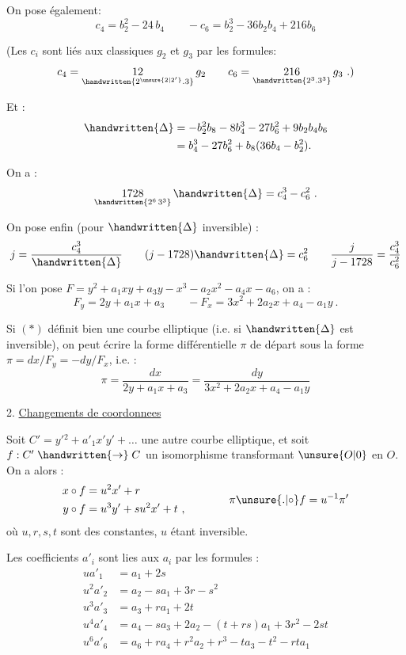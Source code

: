 On pose également:
\[
 c_{4}=b_{2}^{2}-24\,b_{4}\qquad -c_{6}=b_{2}^{3}-36b_{2}b_{4}+216b_{6}
\]

(Les $c_{i}$ sont liés aux classiques $g_{2}$ et $g_{3}$ par les formules:
\[
 c_{4}=\underset{\handwritten{2^{\unsure{2|2'}}\mathord{.}3}}{12}\,g_{2}
 \qquad c_{6}=\underset{\handwritten{2^{3}\mathord{.}3^{3}}}{216}\,g_{3}\ .)
\]

Et :
\[
\begin{aligned}
\handwritten{\Delta}&=-b_{2}^{2}b_{8}-8b_{4}^{3}-27b_{6}^{2}+9b_{2}b_{4}b_{6}\\
&=b_{4}^{3}-27b_{6}^{2}+b_{8}(36b_{4}-b_{2}^{2}).
\end{aligned}
\]

On a :
\[
 \underset{\handwritten{2^{6}\,3^{3}}}{1728}\,\handwritten{\Delta}=c_{4}^{3}-c_{6}^{2}\ .
\]

On pose enfin (pour $\handwritten{\Delta}$ inversible) :
\[
 j=\frac{c_{4}^{3}}{\handwritten{\Delta}}\qquad
 (j-1728)\handwritten{\Delta}=c_{6}^{2}\qquad
 \frac{j}{j-1728}=\frac{c_{4}^{3}}{c_{6}^{2}}
\]

Si l'on pose $F=y^{2}+a_{1}xy+a_{3}y-x^{3}-a_{2}x^{2}-a_{4}x-a_{6}$, on a :
\[
 F_{y}=2y+a_{1}x+a_{3}\qquad -F_{x}=3x^{2}+2a_{2}x+a_{4}-a_{1}y\ .
\]

Si $(\ast)$ définit bien une courbe elliptique (i.e. si $\handwritten{\Delta}$ est inversible), on peut écrire la forme différentielle $\pi$ de départ sous la forme $\pi=dx/F_{y}=-dy/F_{x}$, i.e. :
\[
 \pi=\frac{dx}{2y+a_{1}x+a_{3}}=\frac{dy}{3x^{2}+2a_{2}x+a_{4}-a_{1}y}
\]


2. \uline{Changements de coordonnees}

Soit $C'=y'{}^{2}+a'_{1}x'y'+\ldots$ une autre courbe elliptique, et soit $f:C'\mathrel{\handwritten{\to}}C$ un isomorphisme transformant $\unsure{O|0}$ en $O$. On a alors :
\[
\begin{aligned}
x\circ f&=u^{2}x'+r\\
y\circ f&=u^{3}y'+su^{2}x'+t\ ,
\end{aligned}
\qquad\qquad \pi\unsure{\mathord{.}|\circ}f=u^{-1}\pi'
\]
où $u,r,s,t$ sont des constantes, $u$ étant inversible.

Les coefficients $a'_{i}$ sont lies aux $a_{i}$ par les formules :
\[
\begin{aligned}
ua'_{1}&=a_{1}+2s\\
u^{2}a'_{2}&=a_{2}-sa_{1}+3r-s^{2}\\
u^{3}a'_{3}&=a_{3}+ra_{1}+2t\\
u^{4}a'_{4}&=a_{4}-sa_{3}+2a_{2}-(t+rs)a_{1}+3r^{2}-2st\\
u^{6}a'_{6}&=a_{6}+ra_{4}+r^{2}a_{2}+r^{3}-ta_{3}-t^{2}-rta_{1}
\end{aligned}
\]

